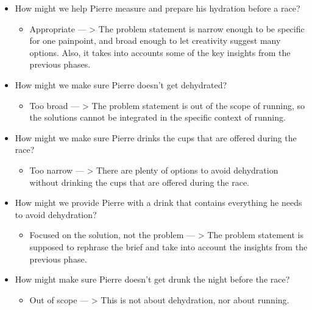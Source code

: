 \begin{itemize}
\item How might we help Pierre measure and prepare his hydration before a race?
\begin{itemize}
\item Appropriate  --- > The problem statement is narrow enough to be specific for one painpoint, and broad enough to let creativity suggest many options. Also, it takes into accounts some of the key insights from the previous phases.
\end{itemize}
\item How might we make sure Pierre doesn't get dehydrated?
\begin{itemize}
\item Too broad  --- > The problem statement is out of the scope of running, so the solutions cannot be integrated in the specific context of running.
\end{itemize}
\item How might we make sure Pierre drinks the cups that are offered during the race?
\begin{itemize}
\item Too narrow  --- > There are plenty of options to avoid dehydration without drinking the cups that are offered during the race.
\end{itemize}
\item How might we provide Pierre with a drink that contains everything he needs to avoid dehydration?
\begin{itemize}
\item Focused on the solution, not the problem  --- > The problem statement is supposed to rephrase the brief and take into account the insights from the previous phase.
\end{itemize}
\item How might make sure Pierre doesn't get drunk the night before the race?
\begin{itemize}
\item Out of scope  --- > This is not about dehydration, nor about running.
\end{itemize}
\end{itemize}

